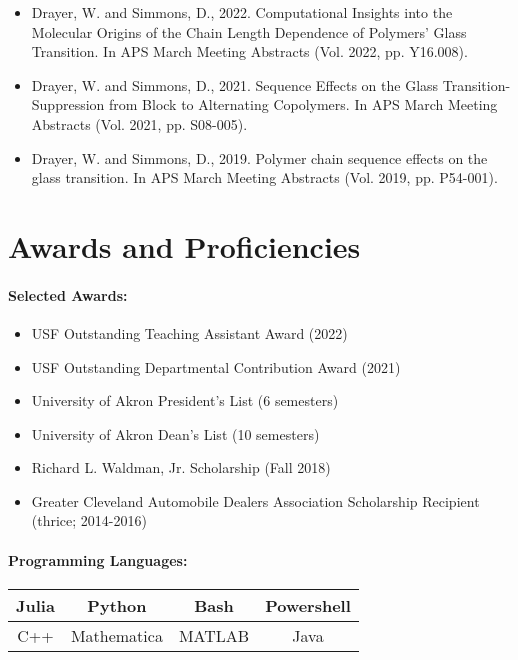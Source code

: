 \documentclass{my_cv}
\begin{document}
\begin{itemize}
    \item Drayer, W. and Simmons, D., 2022. Computational Insights into the Molecular Origins of the Chain Length Dependence of Polymers' Glass Transition. In APS March Meeting Abstracts (Vol. 2022, pp. Y16.008).
    \item Drayer, W. and Simmons, D., 2021. Sequence Effects on the Glass Transition-Suppression from Block to Alternating Co\-polymers. In APS March Meeting Abstracts (Vol. 2021, pp. S08-005).
    \item Drayer, W. and Simmons, D., 2019. Polymer chain sequence effects on the glass transition. In APS March Meeting Abstracts (Vol. 2019, pp. P54-001).
\end{itemize}

\section{Awards and Proficiencies}
\paragraph{Selected Awards:}
\begin{itemize}
    \item USF Outstanding Teaching Assistant Award (2022)
    \item USF Outstanding Departmental Contribution Award (2021)
    \item University of Akron President's List (6 semesters)
    \item University of Akron Dean's List (10 semesters)
    \item Richard L. Waldman, Jr. Scholarship (Fall 2018)
    \item Greater Cleveland Automobile Dealers Association Scholarship Recipient (thrice; 2014-2016)

\end{itemize}

\paragraph{Programming Languages:}
\begin{center}
\begin{tabular}{c|c|c|c}
    Julia & Python & Bash & Powershell \\
    \hline
    C++ & Mathematica & MATLAB & Java \\
\end{tabular}
\end{center}
\end{document}
